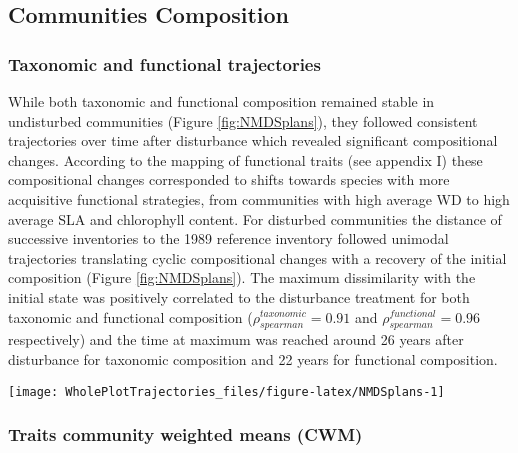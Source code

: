 \documentclass[fleqn,10pt]{ArtEcoFoG} %
\theoremstyle{definition}
\theoremstyle{definition}
\theoremstyle{definition}
\theoremstyle{remark}
\begin{document}
\subsection{Communities Composition}\label{communities-composition}

\subsubsection{Taxonomic and functional
trajectories}\label{taxonomic-and-functional-trajectories}

While both taxonomic and functional composition remained stable in
undisturbed communities (Figure \ref{fig:NMDSplans}), they followed
consistent trajectories over time after disturbance which revealed
significant compositional changes. According to the mapping of
functional traits (see appendix I) these compositional changes
corresponded to shifts towards species with more acquisitive functional
strategies, from communities with high average WD to high average SLA
and chlorophyll content. For disturbed communities the distance of
successive inventories to the 1989 reference inventory followed unimodal
trajectories translating cyclic compositional changes with a recovery of
the initial composition (Figure \ref{fig:NMDSplans}). The maximum
dissimilarity with the initial state was positively correlated to the
disturbance treatment for both taxonomic and functional composition
(\(\rho_{spearman}^{taxonomic}=0.91\) and
\(\rho_{spearman}^{functional}=0.96\) respectively) and the time at
maximum was reached around 26 years after disturbance for taxonomic
composition and 22 years for functional composition.

\begin{figure*}

{\centering \texttt{[image: WholePlotTrajectories\_files/figure-latex/NMDSplans-1]} 

}

\caption{Plot trajectories in terms of flora composition (left panels \textbf{(a)} and \textbf{(c)}) and functional composition (right panels \textbf{(b)} and \textbf{(d)}) in a two-dimensional NMDS space. Lower panels (\textbf{(c)} and \textbf{(d)}) represent the euclidean distance to initial condition along the 30 sampled years. Colors are treatments: green (control), blue (T1), orange (T2), red (T3) with shaded areas the credibility intervals}\label{fig:NMDSplans}
\end{figure*}

\subsubsection{Traits community weighted means
(CWM)}\label{traits-community-weighted-means-cwm}
\end{document}
